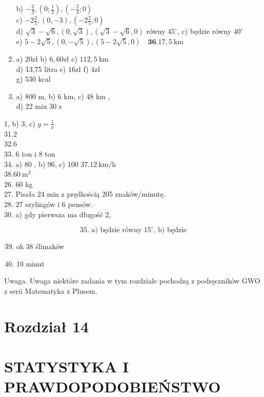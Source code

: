 \documentclass[10pt]{article}
\begin{document}
\begin{enumerate}
b) \(-\frac{2}{3},\left(0 ; \frac{1}{2}\right),\left(-\frac{2}{3} ; 0\right)\)\\
c) \(-2 \frac{2}{5},(0,-3),\left(-2 \frac{2}{5}, 0\right)\)\\
d) \(\sqrt{3}-\sqrt{6},(0, \sqrt{3}),(\sqrt{3}-\sqrt{6}, 0)\) równy \(45^{\circ}\), c) będzie równy \(40^{\circ}\)\\
e) \(5-2 \sqrt{5},(0,-\sqrt{5}),(5-2 \sqrt{5}, 0) \quad \mathbf{3 6} .17,5 \mathrm{~km}\)
  \item a) \(20 \mathrm{zł}\) b) \(6,60 \mathrm{zł}\) c) \(112,5 \mathrm{~km}\)\\
d) 13,75 litra e) \(16 \mathrm{zł}\) f) \(4 \mathrm{zł}\)\\
g) 530 kcal
  \item a) 800 m, b) 6 km, c) 48 km ,\\
d) 22 min 30 s
\end{enumerate}

1, b) 3, c) \(y=\frac{1}{x}\)\\
31.2\\
32.6\\
33. 6 ton i 8 ton\\
34. a) 80 , b) 96, c) 100 \(37.12 \mathrm{~km} / \mathrm{h}\)\\
\(38.60 \mathrm{~m}^{2}\)\\
26. 60 kg\\
27. Pisała 24 min z prędkością 205 znaków/minutę.\\
28. 27 szylingów i 6 pensów.\\
30. a) gdy pierwsza ma długość 2,

\[
\text { 35. a) będzie równy } 15^{\circ} \text {, b) będzie }
\]

\begin{enumerate}
  \setcounter{enumi}{38}
  \item ok 38 ślimaków
  \item 10 minut
\end{enumerate}

Uwaga. Uwaga niektóre zadania w tym rozdziale pochodzą z podręczników GWO z serii Matematyka z Plusem.

\section*{Rozdział 14}
\section*{STATYSTYKA I PRAWDOPODOBIEŃSTWO}
\end{document}
